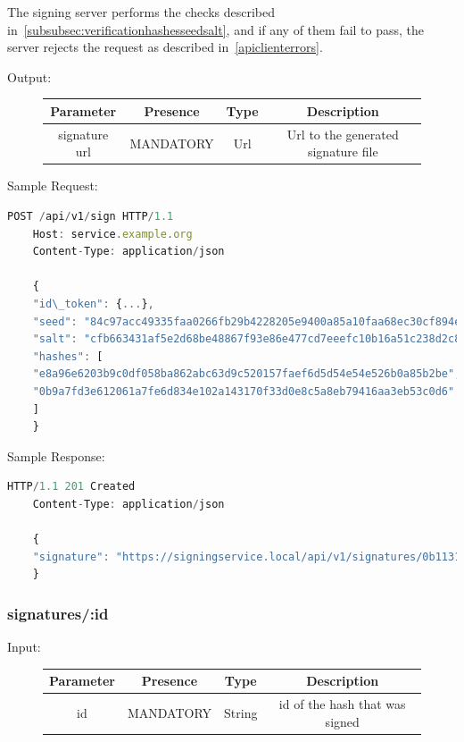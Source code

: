 The signing server performs the checks described in~\ref{subsubsec:verificationhashesseedsalt},
and if any of them fail to pass,
the server rejects the request as described in~\ref{apiclienterrors}.

Output:

\begin{figure}[H]
    \begin{center}
        \begin{tabular}{c|c|c|c}
            \textbf{Parameter} & \textbf{Presence} & \textbf{Type} & \textbf{Description} \\
            \hline
            signature url & MANDATORY & Url & Url to the generated signature file \\
        \end{tabular}
    \end{center}
\end{figure}

Sample Request:
\begin{lstlisting}[caption={Sign request}, captionpos=b, language=JavaScript, label={lst:signrequestexample}]
    POST /api/v1/sign HTTP/1.1
    Host: service.example.org
    Content-Type: application/json

    {
    "id\_token": {...},
    "seed": "84c97acc49335faa0266fb29b4228205e9400a85a10faa68ec30cf894e1730ed",
    "salt": "cfb663431af5e2d68be48867f93e86e477cd7eeefc10b16a51c238d2c810561b",
    "hashes": [
    "e8a96e6203b9c0df058ba862abc63d9c520157faef6d5d54e54e526b0a85b2be",
    "0b9a7fd3e612061a7fe6d834e102a143170f33d0e8c5a8eb79416aa3eb53c0d6"
    ]
    }
\end{lstlisting}

Sample Response:

\begin{lstlisting}[caption={sign response}, captionpos=b, language=JavaScript, label={lst:signresponse}]
    HTTP/1.1 201 Created
    Content-Type: application/json

    {
    "signature": "https://signingservice.local/api/v1/signatures/0b1131ca0b68f3d55b8e32a55e8"
    }
\end{lstlisting}

\subsubsection{signatures/:id}
Input:

\begin{figure}[H]
    \begin{center}
        \begin{tabular}{c|c|c|c}
            \textbf{Parameter} & \textbf{Presence} & \textbf{Type} & \textbf{Description} \\
            \hline
            id & MANDATORY & String & id of the hash that was signed \\
        \end{tabular}
    \end{center}
\end{figure}

